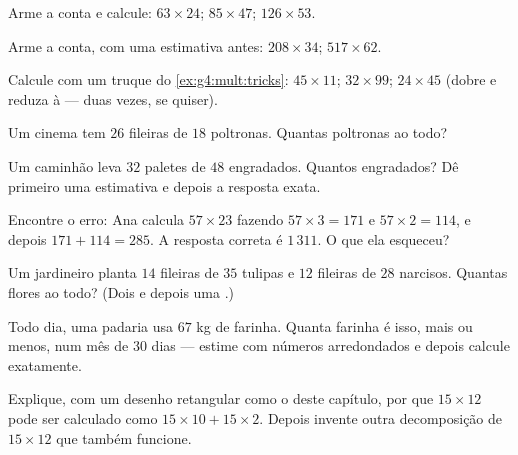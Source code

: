 \begin{exercise}[$\star$]\label{exo:g4:mult:3}
Arme a conta e calcule: $63 \times 24$; \quad $85 \times 47$; \quad
$126 \times 53$.
\end{exercise}

\begin{exercise}[$\star$]\label{exo:g4:mult:4}
Arme a conta, com uma estimativa antes: $208 \times 34$; \quad
$517 \times 62$.
\end{exercise}

\begin{exercise}[$\star$]\label{exo:g4:mult:5}
Calcule com um truque do \cref{ex:g4:mult:tricks}:
$45 \times 11$; \quad $32 \times 99$; \quad $24 \times 45$ (dobre e
reduza à  --- duas vezes, se quiser).
\end{exercise}

\begin{exercise}[$\star$]\label{exo:g4:mult:6}
Um cinema tem $26$ fileiras de $18$ poltronas. Quantas poltronas ao
todo?
\end{exercise}

\begin{exercise}[$\star$]\label{exo:g4:mult:7}
Um caminhão leva $32$ paletes de $48$ engradados. Quantos
engradados? Dê primeiro uma estimativa e depois a resposta exata.
\end{exercise}

\begin{exercise}[$\star$]\label{exo:g4:mult:8}
Encontre o erro: Ana calcula $57 \times 23$ fazendo
$57 \times 3 = 171$ e $57 \times 2 = 114$, e depois 
$171 + 114 = 285$. A resposta correta é $1\,311$. O que ela
esqueceu?
\end{exercise}

\begin{exercise}[$\star\star$]\label{exo:g4:mult:9}
Um jardineiro planta $14$ fileiras de $35$ tulipas e $12$ fileiras de
$28$ narcisos. Quantas flores ao todo? (Dois  e depois uma
.)
\end{exercise}

\begin{exercise}[$\star\star$]\label{exo:g4:mult:10}
Todo dia, uma padaria usa $67$ kg de farinha. Quanta farinha é isso,
mais ou menos, num mês de $30$ dias --- estime com números
arredondados e depois calcule exatamente.
\end{exercise}

\begin{exercise}[$\star\star$]\label{exo:g4:mult:11}
Explique, com um desenho retangular como o deste capítulo, por que
$15 \times 12$ pode ser calculado como
$15 \times 10 + 15 \times 2$. Depois invente outra decomposição de
$15 \times 12$ que também funcione.
\end{exercise}
